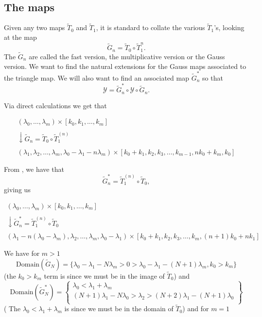 \documentclass[12pt,oneside,openany]{article}
\begin{document}
\subsection{The maps}


Given any two maps $\tilde{T}_0$ and $\tilde{T}_1$, it is standard to collate the various $  \tilde{T  } _1$'s, looking at the map
$$ \tilde{G  }_n =  \tilde{T  }_0 \circ  \tilde{T  }_1^{n}.$$
The $ \tilde{G  }_n$ are called the fast version, the multiplicative version or the Gauss version.
We want to find the natural extensions for the Gauss maps associated to the triangle map.  We will also want to find an associated map $  \tilde{G  }_n^*$ so that
$$\mathcal{Y} =  \tilde{G  }_n^* \circ \mathcal{Y} \circ  \tilde{G  }_n.$$

Via direct calculations we get that 

$$\begin{array}{c}
(\lambda_0, \ldots, \lambda_m) \times [k_0, k_1, \ldots, k_m] \\ \\
\downarrow \tilde{G}_n =  \tilde{T  }_0 \circ  \tilde{T  }_1^{(n)}  \\
\\
(\lambda_1, \lambda_2, \ldots, \lambda_m, \lambda_0-\lambda_1 - n\lambda_m) \times [k_0+k_1, k_2, k_3, \ldots, k_{m-1}, nk_0 +k_m, k_0]
  \end{array}$$

 From  \cite{BBDGI}, we have that 
  $$ \tilde{G  }_n^* =  \tilde{T  }_1^{(n)} \circ  \tilde{T  }_0,$$
  giving us 
  
  
$$\begin{array}{c}
(\lambda_0, \ldots, \lambda_m) \times [k_0, k_1, \ldots, k_m] \\ \\
\downarrow \tilde{G}_n^* =    \tilde{T  }_1^{(n)} \circ  \tilde{T  }_0 \\ 
\\
(\lambda_1- n(\lambda_0-\lambda_m) , \lambda_2, \ldots, \lambda_m, \lambda_0-\lambda_1) \times [k_0+k_1, k_2, k_3, \ldots, k_{m}, (n+1) k_0 + n k_1]
  \end{array}$$
  
  We have for $m>1$ 
$$
\mbox{Domain}(\tilde{G}_N)  = \{ \lambda_0 - \lambda_1 - N \lambda_m >0 >  \lambda_0 - \lambda_1 -(N+1)  \lambda_m , k_0>k_m  \}  $$
(the $k_0>k_m$ term is since we must be in the image of $\tilde{T}_0$)
and 
$$\mbox{Domain}(\tilde{G}_N^*)  = \left\{  \begin{matrix} \lambda_0 < \lambda_1+ \lambda_m \\
(N+1) \lambda_1 - N\lambda_0 > \lambda_2 > (N+2) \lambda_1 - (N+1)\lambda_0 \\
\end{matrix} \right\}
$$
( The $\lambda_0 < \lambda_1+ \lambda_m$ is since we must be in the domain of $\tilde{T}_0$)
 and for $m=1$
\end{document}
